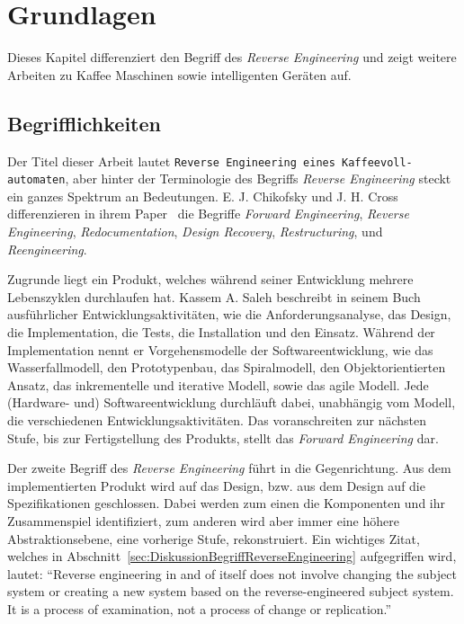 \chapter{Grundlagen}\label{ch:Grundlagen}
Dieses Kapitel differenziert den Begriff des \textit{Reverse Engineering} und zeigt weitere Arbeiten zu Kaffee Maschinen sowie intelligenten Geräten auf.

\section{Begrifflichkeiten}\label{sec:Begrifflichkeiten}
Der Titel dieser Arbeit lautet \texttt{Reverse Engineering eines Kaffeevoll-\\automaten}, aber hinter der Terminologie des Begriffs \textit{Reverse Engineering} steckt ein ganzes Spektrum an Bedeutungen.
E. J. Chikofsky und J. H. Cross differenzieren in ihrem Paper~\cite{43044} die Begriffe \textit{Forward Engineering}, \textit{Reverse Engineering}, \textit{Redocumentation}, \textit{Design Recovery}, \textit{Restructuring}, und \textit{Reengineering}.

Zugrunde liegt ein Produkt, welches während seiner Entwicklung mehrere Lebenszyklen durchlaufen hat.
Kassem A. Saleh beschreibt in seinem Buch~\cite{Solr-599853700} ausführlicher Entwicklungsaktivitäten, wie die Anforderungsanalyse, das Design, die Implementation, die Tests, die Installation und den Einsatz.
Während der Implementation nennt er Vorgehensmodelle der Softwareentwicklung, wie das Wasserfallmodell, den Prototypenbau, das Spiralmodell, den Objektorientierten Ansatz, das inkrementelle und iterative Modell, sowie das agile Modell.
Jede (Hardware- und) Softwareentwicklung durchläuft dabei, unabhängig vom Modell, die verschiedenen Entwicklungsaktivitäten.
Das voranschreiten zur nächsten Stufe, bis zur Fertigstellung des Produkts, stellt das \textit{Forward Engineering} dar.

Der zweite Begriff des \textit{Reverse Engineering} führt in die Gegenrichtung.
Aus dem implementierten Produkt wird auf das Design, bzw. aus dem Design auf die Spezifikationen geschlossen.
Dabei werden zum einen die Komponenten und ihr Zusammenspiel identifiziert, zum anderen wird aber immer eine höhere Abstraktionsebene, eine vorherige Stufe, rekonstruiert.
Ein wichtiges Zitat, welches in Abschnitt~\ref{sec:DiskussionBegriffReverseEngineering}  aufgegriffen wird, lautet: "`Reverse engineering in and of itself does not involve changing the subject system or creating a new system based on the reverse-engineered subject system.
It is a process of examination, not a process of change or replication."'\cite{43044}

